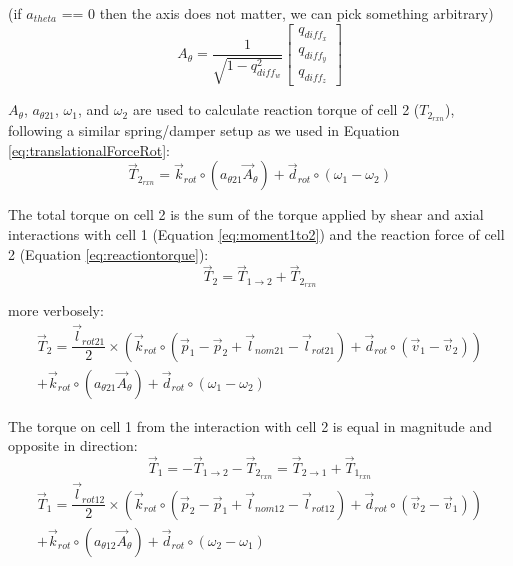 {(if $a_{theta}$ == 0 then the axis does not matter, we can pick something arbitrary)
\[ A_{\theta} = \dfrac{1}{\sqrt{1-q_{diff_w}^2}} \left[ \begin{array}{ccc}
q_{diff_x}\\
q_{diff_y}\\
q_{diff_z}
 \end{array} \right] \]
 
$A_{\theta}$,  $a_{\theta21}$, $\omega_1$, and $\omega_2$ are used to calculate reaction torque of cell 2 ($T_{2_{rxn}}$), following a similar spring/damper setup as we used in Equation \ref{eq:translationalForceRot}:
\begin{equation}\label{eq:reactiontorque}
\vec{T}_{2_{rxn}} = \vec{k}_{rot} \circ (a_{\theta21} \vec{A}_{\theta}) + \vec{d}_{rot} \circ (\omega_1-\omega_2)
\end{equation}

The total torque on cell 2 is the sum of the torque applied by shear and axial interactions with cell 1 (Equation \ref{eq:moment1to2}) and the reaction force of cell 2 (Equation \ref{eq:reactiontorque}):
\begin{equation}\label{eq:torqueEquation}
\vec{T}_2 = \vec{T}_{1\rightarrow2} + \vec{T}_{2_{rxn}}
\end{equation}

more verbosely:
\begin{multline}\label{eq:T2verbose}
\vec{T}_2 = \dfrac{\vec{l}_{rot21}}{2} \times (\vec{k}_{rot} \circ (\vec{p}_1 - \vec{p}_2 + \vec{l}_{nom21}-\vec{l}_{rot21}) + \vec{d}_{rot} \circ (\vec{v}_1 - \vec{v}_2)) \\+ \vec{k}_{rot} \circ (a_{\theta21} \vec{A}_{\theta}) + \vec{d}_{rot} \circ (\omega_1-\omega_2)
\end{multline}

The torque on cell 1 from the interaction with cell 2 is equal in magnitude and opposite in direction:
\begin{equation}\label{eq:torqueEqOpp}
\vec{T}_1 = -\vec{T}_{1\rightarrow2} - \vec{T}_{2_{rxn}}  = \vec{T}_{2\rightarrow1} + \vec{T}_{1_{rxn}}
\end{equation}
\begin{multline}\label{eq:T1verbose}
\vec{T}_1 = \dfrac{\vec{l}_{rot12}}{2} \times (\vec{k}_{rot} \circ (\vec{p}_2 - \vec{p}_1 + \vec{l}_{nom12}-\vec{l}_{rot12}) + \vec{d}_{rot} \circ (\vec{v}_2 - \vec{v}_1)) \\+ \vec{k}_{rot} \circ (a_{\theta12} \vec{A}_{\theta}) + \vec{d}_{rot} \circ (\omega_2-\omega_1)
\end{multline}

}

